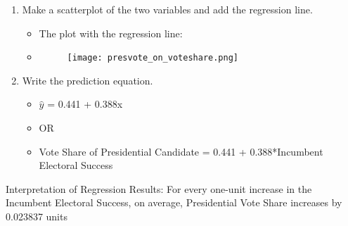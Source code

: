 \documentclass[12pt,letterpaper]{article}
\begin{document}
\begin{enumerate}
		\item Make a scatterplot of the two variables and add the regression line. 


\begin{itemize}
	\item The plot with the regression line:
	\item 
	\begin{figure}[h]
		\centering
		\texttt{[image: presvote\_on\_voteshare.png]}
	\end{figure}
\end{itemize}
		\item Write the prediction equation.
		
\begin{itemize}
	\item $\hat{y}$ = 0.441 + 0.388x
	\item OR
	\item Vote Share of Presidential Candidate = 0.441 + 0.388*Incumbent Electoral Success
\end{itemize}
	\end{enumerate}


Interpretation of Regression Results: For every one-unit increase in the Incumbent Electoral Success, on average, Presidential Vote Share increases by 0.023837 units
	
	
\end{document}

